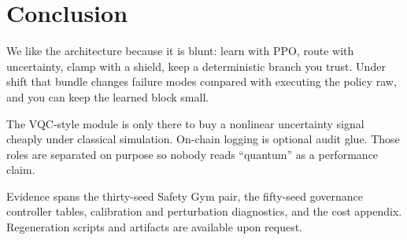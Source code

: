 \section{Conclusion}

We like the architecture because it is blunt: learn with PPO, route with uncertainty, clamp with a shield, keep a deterministic branch you trust. Under shift that bundle changes failure modes compared with executing the policy raw, and you can keep the learned block small.

The VQC-style module is only there to buy a nonlinear uncertainty signal cheaply under classical simulation. On-chain logging is optional audit glue. Those roles are separated on purpose so nobody reads ``quantum'' as a performance claim.

Evidence spans the thirty-seed Safety Gym pair, the fifty-seed governance controller tables, calibration and perturbation diagnostics, and the cost appendix. Regeneration scripts and artifacts are available upon request.
